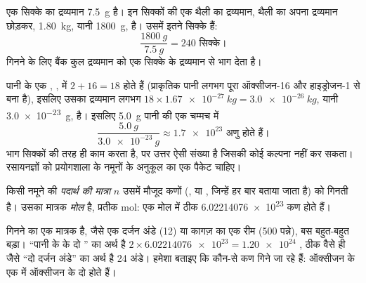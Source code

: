 \begin{example}[सिक्कों की थैली]\label{ex:g10:the-mole:coins}
एक सिक्के का द्रव्यमान \qty{7.5}{g} है। इन सिक्कों की एक थैली का द्रव्यमान,
थैली का अपना द्रव्यमान छोड़कर, \qty{1.80}{kg}, यानी \qty{1800}{g}, है।
उसमें इतने सिक्के हैं:
\[
  \frac{\qty{1800}{g}}{\qty{7.5}{g}} = 240 \text{ सिक्के।}
\]
गिनने के लिए बैंक कुल द्रव्यमान को एक सिक्के के द्रव्यमान से भाग देता है।
\end{example}

\begin{example}[पानी की एक चम्मच]\label{ex:g10:the-mole:spoon}
पानी के एक , , में $2 + 16 = 18$  होते हैं (प्राकृतिक पानी
लगभग पूरा ऑक्सीजन-16 और हाइड्रोजन-1  से बना है), इसलिए उसका द्रव्यमान
लगभग $18 \times \qty{1.67e-27}{kg} = \qty{3.0e-26}{kg}$, यानी
\qty{3.0e-23}{g}, है। इसलिए \qty{5.0}{g} पानी की एक चम्मच में
\[
  \frac{\qty{5.0}{g}}{\qty{3.0e-23}{g}} \approx \num{1.7e23}
  \text{ अणु होते हैं।}
\]
भाग सिक्कों की तरह ही काम करता है, पर उत्तर ऐसी संख्या है जिसकी कोई कल्पना
नहीं कर सकता। रसायनज्ञों को प्रयोगशाला के नमूनों के अनुकूल  का एक
पैकेट चाहिए।
\end{example}

\begin{definition}[पदार्थ की मात्रा और मोल]\label{def:g10:the-mole:amount}
किसी नमूने की \emph{पदार्थ की मात्रा} $n$ उसमें मौजूद
कणों (,  या , जिन्हें हर बार बताया जाता है) को गिनती है। उसका
मात्रक \emph{मोल} है, प्रतीक \si{mol}: एक मोल में
ठीक \num{6.02214076e23} कण होते हैं।
\end{definition}

\begin{remark}[एक दर्जन, एक रीम, एक मोल]\label{rem:g10:the-mole:dozen}
 गिनने का एक मात्रक है, जैसे एक दर्जन अंडे (12) या कागज़ का एक रीम
(500 पन्ने), बस बहुत-बहुत बड़ा। ``पानी के  के दो '' का अर्थ है
$2 \times \num{6.02214076e23} = \num{1.20e24}$ , ठीक वैसे ही जैसे
``दो दर्जन अंडे'' का अर्थ है 24 अंडे। हमेशा बताइए कि कौन-से कण गिने जा रहे हैं:
ऑक्सीजन \emph{}  के एक  में ऑक्सीजन \emph{} के
दो  होते हैं।
\end{remark}

